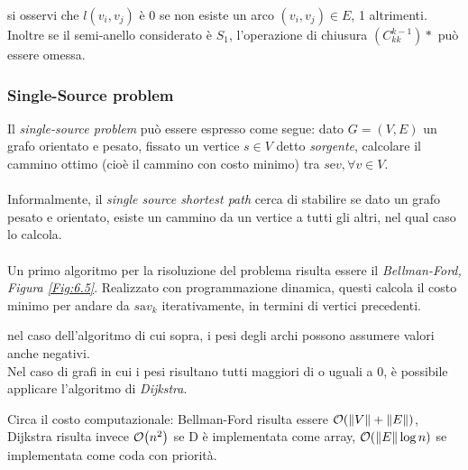 \documentclass{subfiles}
\begin{document}
si osservi che \(l(v_{i}, v_{j})\) è 0 se non esiste un arco \((v_{i}, v_{j}) \in E\), 1 altrimenti.
Inoltre se il semi-anello considerato è \(S_{1}\), l'operazione di chiusura \((C^{k - 1}_{kk})*\) può essere omessa.
\clearpage

\subsubsection{Single-Source problem}
Il \emph{single-source problem} può essere espresso come segue: dato \(G = (V, E)\) un grafo orientato e pesato, fissato un vertice \(s \in V\) detto \emph{sorgente},
calcolare il cammino ottimo (cioè il cammino con costo minimo) tra \(s \text{e} v, \forall v \in V\).
\\ \\
Informalmente, il \emph{single source shortest path} cerca di stabilire se dato un grafo pesato e orientato,
esiste un cammino da un vertice a tutti gli altri, nel qual caso lo calcola.
\\ \\
Un primo algoritmo per la risoluzione del problema risulta essere il \emph{Bellman-Ford, Figura \ref{Fig:6.5}}.
Realizzato con programmazione dinamica, questi calcola il costo minimo per andare da \(s \text{a} v_{k}\) iterativamente, in termini di vertici precedenti.


\noindent nel caso dell'algoritmo di cui sopra, i pesi degli archi possono assumere valori anche negativi. \\
Nel caso di grafi in cui i pesi risultano tutti maggiori di o uguali a 0, è possibile applicare l'algoritmo di \emph{Dijkstra}.


\noindent Circa il costo computazionale: Bellman-Ford risulta essere \(\order{\norm{V} + \norm{E}}\), Dijkstra risulta invece \(\order{n^{2}}\) se D è implementata come array,
\(\order{\norm{E} \log n}\) se implementata come coda con priorità.
\end{document}
